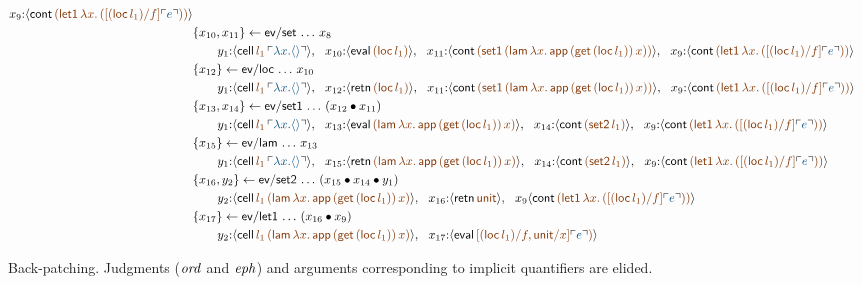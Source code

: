 \begin{sidewaysfigure}[p]
\begin{align*}
x_9{:}\susp{{\sf cont}\,
  \lf{({\sf let1}\,\lambda x.\,([({\sf loc}\,l_1)/f]\interp{e}))}}
\\
& \trstep{x_{10},x_{11}}{{\sf ev/set}\,\ldots\,x_8}
\\
&\qquad
y_1{:}\susp{{\sf cell}\,\lf{l_1}\,\interp{\lambda x. \langle\rangle}}, ~~
x_{10}{:}\susp{{\sf eval}\,
  \lf{({\sf loc}\,l_1)}}, ~~
x_{11}{:}\susp{{\sf cont}\,
  \lf{({\sf set1}\,({\sf lam}\,\lambda x.\,{\sf app}\,({\sf get}\,({\sf loc}\,l_1))\,x))}}, ~~
x_9{:}\susp{{\sf cont}\,
  \lf{({\sf let1}\,\lambda x.\,([({\sf loc}\,l_1)/f]\interp{e}))}}
\\
& \trstep{x_{12}}{{\sf ev/loc}\,\ldots\,x_{10}}
\\
&\qquad
y_1{:}\susp{{\sf cell}\,\lf{l_1}\,\interp{\lambda x. \langle\rangle}}, ~~
x_{12}{:}\susp{{\sf retn}\,
  \lf{({\sf loc}\,l_1)}}, ~~
x_{11}{:}\susp{{\sf cont}\,
  \lf{({\sf set1}\,({\sf lam}\,\lambda x.\,{\sf app}\,({\sf get}\,({\sf loc}\,l_1))\,x))}}, ~~
x_9{:}\susp{{\sf cont}\,
  \lf{({\sf let1}\,\lambda x.\,([({\sf loc}\,l_1)/f]\interp{e}))}}
\\
& \trstep{x_{13},x_{14}}{{\sf ev/set1}\,\ldots\,(\tfuser{x_{12}}{x_{11}})}
\\
&\qquad
y_1{:}\susp{{\sf cell}\,\lf{l_1}\,\interp{\lambda x. \langle\rangle}}, ~~
x_{13}{:}\susp{{\sf eval}\,
  \lf{({\sf lam}\,\lambda x.\,{\sf app}\,({\sf get}\,({\sf loc}\,l_1))\,x)}}, ~~
x_{14}{:}\susp{{\sf cont}\,
  \lf{({\sf set2}\,l_1)}}, ~~
x_9{:}\susp{{\sf cont}\,
  \lf{({\sf let1}\,\lambda x.\,([({\sf loc}\,l_1)/f]\interp{e}))}}
\\
& \trstep{x_{15}}{{\sf ev/lam}\,\ldots\,x_{13}}
\\
&\qquad
y_1{:}\susp{{\sf cell}\,\lf{l_1}\,\interp{\lambda x. \langle\rangle}}, ~~
x_{15}{:}\susp{{\sf retn}\,
  \lf{({\sf lam}\,\lambda x.\,{\sf app}\,({\sf get}\,({\sf loc}\,l_1))\,x)}}, ~~
x_{14}{:}\susp{{\sf cont}\,
  \lf{({\sf set2}\,l_1)}}, ~~
x_9{:}\susp{{\sf cont}\,
  \lf{({\sf let1}\,\lambda x.\,([({\sf loc}\,l_1)/f]\interp{e}))}}
\\
& \trstep{x_{16},y_2}{{\sf ev/set2}\,\ldots\,(\tfuser{x_{15}}{\tfuser{x_{14}}{y_1}})}
\\
&\qquad
y_2{:}\susp{{\sf cell}\,\lf{l_1}\,
  \lf{({\sf lam}\,\lambda x.\,{\sf app}\,({\sf get}\,({\sf loc}\,l_1))\,x)}}, ~~
x_{16}{:}\susp{{\sf retn}\,
  \lf{\sf unit}}, ~~
x_9\susp{{\sf cont}\,
  \lf{({\sf let1}\,\lambda x.\,([({\sf loc}\,l_1)/f]\interp{e}))}}
\\
& \trstep{x_{17}}{{\sf ev/let1}\,\ldots\,(\tfuser{x_{16}}{x_9})}
\\
&\qquad
y_2{:}\susp{{\sf cell}\,\lf{l_1}\,
  \lf{({\sf lam}\,\lambda x.\,{\sf app}\,({\sf get}\,({\sf loc}\,l_1))\,x)}}, ~~
x_{17}{:}\susp{{\sf eval}\,
  \lf{[({\sf loc}\,l_1)/f, {\sf unit}/x]\interp{e})}}
\end{align*}
\caption{Back-patching. Judgments (${\it ord}$ and ${\it eph}$) and
  arguments corresponding to implicit quantifiers are elided.}
\end{sidewaysfigure}

